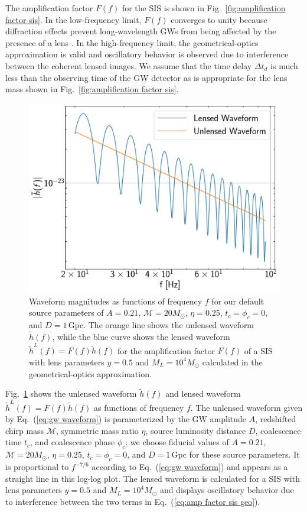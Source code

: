\documentclass[floats,floatfix,showpacs,amssymb,prd,twocolumn,superscriptaddress,nofootinbib,nolongbibliography,reprint]{revtex4-2}
\begin{document}
The amplification factor $F(f)$ for the SIS is shown in Fig.~\ref{fig:amplification factor sis}. In the low-frequency limit, $F(f)$ converges to unity because diffraction effects prevent long-wavelength GWs from being affected by the presence of a lens \cite{Bontz1981ADL, Takahashi_2003}. In the high-frequency limit, the geometrical-optics approximation is valid and oscillatory behavior is observed due to interference between the coherent lensed images. We assume that the time delay $\Delta t_d$ is much less than the observing time of the GW detector as is appropriate for the lens mass shown in Fig.~\ref{fig:amplification factor sis}.
\begin{figure}[t!]
    \centering
    \includegraphics[scale = 0.33]{Figures/sis_waveforms.pdf}
    \caption{Waveform magnitudes as functions of frequency $f$ for our default source parameters of $A = 0.21$, $\mathcal{M} = 20 M_\odot$, $\eta = 0.25$, $t_c = \phi_c = 0$, and $D = 1\,$Gpc. The orange line shows the unlensed waveform $\tilde{h}(f)$, while the blue curve shows the lensed waveform $\tilde{h}^L(f) = F(f)\tilde{h}(f)$ for the amplification factor $F(f)$ of a SIS with lens parameters $y = 0.5$ and $M_L = 10^4 M_\odot$ calculated in the geometrical-optics approximation.
    }
    \label{fig:sis lensed and unlensed waveforms}
\end{figure}

Fig.~\ref{fig:sis lensed and unlensed waveforms} shows the unlensed waveform $\tilde{h}(f)$ and lensed waveform $\tilde{h}^L(f) = F(f)\tilde{h}(f)$ as functions of frequency $f$. The unlensed waveform given by Eq.~(\ref{eq:gw waveform}) is parameterized by the GW amplitude $A$, redshifted chirp mass $\mathcal{M}$, symmetric mass ratio $\eta$, source luminosity distance $D$, coalescence time $t_c$, and coalescence phase $\phi_c$; we choose fiducial values of $A = 0.21$, $\mathcal{M} = 20 M_\odot$, $\eta = 0.25$, $t_c = \phi_c = 0$, and $D = 1\,$Gpc for these source parameters. It is proportional to $f^{-7/6}$ according to Eq.~(\ref{eq:gw waveform}) and appears as a straight line in this log-log plot.
The lensed waveform is calculated for a SIS with lens parameters $y = 0.5$ and $M_L = 10^4 M_\odot$ and displays oscillatory behavior due to interference between the two terms in Eq.~(\ref{eq:amp factor sis geo}).
\end{document}
